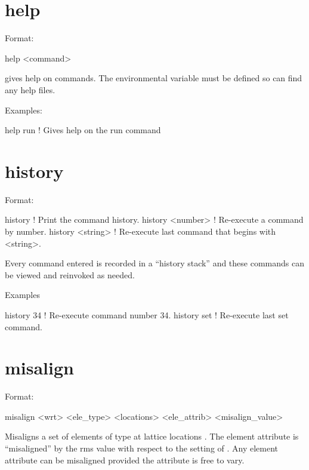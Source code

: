 \section{help}
\label{s:help}

Format:
\begin{example}
  help <command>
\end{example}

\vskip 0.2in 
 gives help on \tao commands. The environmental
variable  must be defined so \tao can find any help files.

Examples:
\begin{example}
  help run   ! Gives help on the run command
\end{example}

\section{history}
\label{s:history}

Format:
\begin{example}
  history           ! Print the command history.
  history <number>  ! Re-execute a command by number.
  history <string>  ! Re-execute last command that begins with <string>.
\end{example}

\vskip 0.2in
Every \tao command entered is recorded in a ``history stack'' and
these commands can be viewed and reinvoked as needed. 

Examples
\begin{example}
  history 34   ! Re-execute command number 34.
  history set  ! Re-execute last set command.  
\end{example}

\section{misalign}
\label{s:misalign}

Format:
\begin{example}
   misalign <wrt> <ele_type> <locations> <ele_attrib> <misalign_value>
\end{example}

\vskip 0.2in
Misaligns a set of elements of type  at lattice
locations .  The element attribute 
is ``misaligned'' by the rms value  with respect
to the setting of . Any element attribute can be misaligned
provided the attribute is free to vary.

